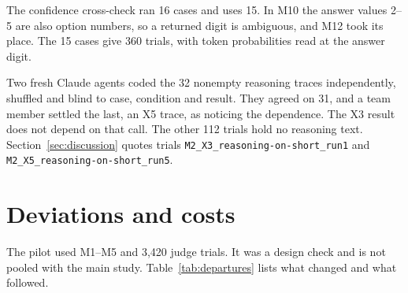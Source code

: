 The confidence cross-check ran 16 cases and uses 15. In M10 the answer values 2--5 are also
option numbers, so a returned digit is ambiguous, and M12 took its place. The 15 cases give 360
trials, with token probabilities read at the answer digit.

Two fresh Claude agents coded the 32 nonempty reasoning traces independently, shuffled and blind
to case, condition and result. They agreed on 31, and a team member settled the last, an X5
trace, as noticing the dependence. The X3 result does not depend on that call. The other 112
trials hold no reasoning text. Section~\ref{sec:discussion} quotes trials
\texttt{M2\_X3\_reasoning-on-short\_run1} and \texttt{M2\_X5\_reasoning-on-short\_run5}.

\clearpage
\section{Deviations and costs}
\label{app:departures}
The pilot used M1--M5 and 3,420 judge trials. It was a design check and is not pooled with
the main study. Table~\ref{tab:departures} lists what changed and what followed.

